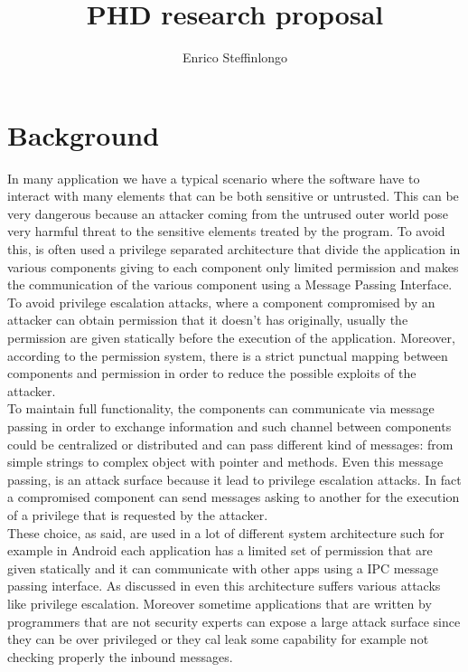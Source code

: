 \documentclass[10pt,a4paper,draft]{article}
\author{Enrico Steffinlongo}
\title{PHD research proposal}
\begin{document}
\maketitle
\section{Background}
In many application we have a typical scenario where the software have to interact with many elements that can be both sensitive or untrusted. This can be very dangerous because an attacker coming from the untrused outer world pose very harmful threat to the sensitive elements treated by the program. To avoid this, is often used a privilege separated architecture that divide the application in various components giving to each component only limited permission and makes the communication of the various component using a Message Passing Interface. To avoid privilege escalation attacks, where a component compromised by an attacker can obtain permission that it doesn't has originally, usually the permission are given statically before the execution of the application. Moreover, according to the permission system, there is a strict punctual mapping between components and permission in order to reduce the possible exploits of the attacker.\\
To maintain full functionality, the components can communicate via message passing in order to exchange information and such channel between components could be centralized or distributed and can pass different kind of messages: from simple strings to complex object with pointer and methods. Even this message passing, is an attack surface because it lead to privilege escalation attacks. In fact a compromised component can send messages asking to another for the execution of a privilege that is requested by the attacker.\\
These choice, as said, are used in a lot of different system architecture such for example in Android each application has a limited set of permission that are given statically and it can communicate with other apps using a IPC message passing interface. As discussed in \cite{AndroidMPI,AndroidPermissions,AndroidPermission,AndroidPrivilegeEscalation,AndroidRedelegation} even this architecture suffers various attacks like privilege escalation. Moreover sometime applications that are written by programmers that are not security experts can expose a large attack surface since they can be over privileged or they cal leak some capability for example not checking properly the inbound messages.\\
\end{document}
